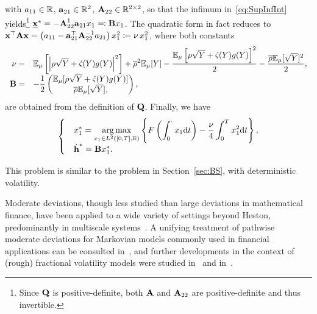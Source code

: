 with $a_{11} \in\mathbb{R}$, $\boldsymbol{\mathrm{a}}_{21}\in\mathbb{R}^{2}$, $\boldsymbol{\mathrm{A}}_{22}\in\mathbb{R}^{2\times 2}$, so that the infimum in~\eqref{eq:SupInfInt} yields\footnote{Since $\boldsymbol{\mathrm{Q}}$ is positive-definite, both $\boldsymbol{\mathrm{A}}$ and $\boldsymbol{\mathrm{A}}_{22}$ are positive-definite and thus invertible.} ${\underline{\boldsymbol{\mathrm{x}}}^{*} = - \boldsymbol{\mathrm{A}}_{22}^{1} \boldsymbol{\mathrm{a}}_{21} x_1 \eqqcolon \boldsymbol{\mathrm{B}} x_1}$. The quadratic form in fact reduces to ${\boldsymbol{\mathrm{x}}^\top \boldsymbol{\mathrm{A}} \boldsymbol{\mathrm{x}} = \left( a_{11} - \boldsymbol{\mathrm{a}}_{21}^\top \boldsymbol{\mathrm{A}}_{22}^{-1} a_{21} \right ) x_1^2 \coloneqq \nu\, x_1^2}$, where both constants
\begin{equation}\label{eq:ConstPDP}
\begin{array}{rl}
\nu = & \displaystyle 
\mathbb{E}_\mu\left[ \left| \rho\sqrt{Y} + \dot{\varsigma}(Y)g(Y)\right|^2 \right ] + \overline{\rho}^2\mathbb{E}_\mu[Y] - \frac{\mathbb{E}_\mu\left[ \rho\sqrt{Y} + \dot{\varsigma}(Y)g(Y)\right]^2}{2} - \frac{\overline{\rho}\mathbb{E}_\mu[\sqrt{Y}]^2}{2},\\
\boldsymbol{\mathrm{B}} = & \displaystyle -\frac{1}{2}\begin{pmatrix}
\mathbb{E}_\mu[\rho\sqrt{Y}+\dot{\varsigma}(Y)g(Y)]\\
\overline{\rho}\mathbb{E}_\mu[\sqrt{Y}],
\end{pmatrix},
\end{array}
\end{equation}
are obtained from the definition of $\boldsymbol{\mathrm{Q}}$. Finally, we have
\begin{equation}\label{pb-deterministic-large}
\begin{cases}
&\displaystyle x_1^{*}=\operatorname*{arg\,max}\limits_{x_1 \in L^2([0,T],\mathbb{R})}
\left\{F\left(\int_0^\cdot x_1\mathrm{d} t\right) - \frac{\nu}{4}\int_0^T x_1^2 \mathrm{d} t\right\},
\\
&\dot{\boldsymbol{\mathrm{h}}}^{*}
= \boldsymbol{\mathrm{B}} x_1^{*}.
\end{cases}
\end{equation}
\begin{remark}
This problem is similar to the problem in Section~\ref{sec:BS}, with deterministic volatility.
\end{remark}

Moderate deviations, though less studied
than large deviations in mathematical finance,  
have been applied to a wide variety of settings beyond Heston, predominantly in multiscale systems~\cite{Morse2017ModerateDiffusions, Morse2020ImportanceDeviations}. 
A unifying treatment of pathwise moderate deviations for Markovian models commonly used in financial applications
can be consulted in~\cite{Jacquier2019PathwisePricing},
and further developments in the context of (rough) fractional volatility models 
were studied in~\cite{Bayer2018Short-timeModels} 
and in~\cite{Jacquier2022LargeSystems}.


